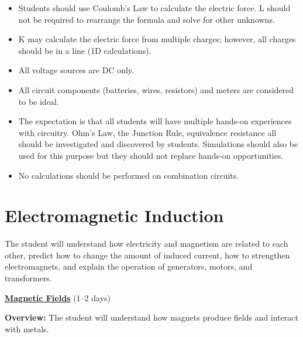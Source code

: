 \documentclass[dvipsnames]{article}
\begin{document}
\begin{itemize}[topsep=-3pt,itemsep=0pt]
    \item Students should use Coulomb's Law to calculate the electric force. L should not be required to rearrange the formula and solve for other unknowns.
    \item K may calculate the electric force from multiple charges; however, all charges should be in a line (1D calculations).
    \item All voltage sources are DC only.
    \item All circuit components (batteries, wires, resistors) and meters are considered to be ideal.
    \item The expectation is that all students will have multiple hands-on experiences with circuitry. Ohm's Law, the Junction Rule, equivalence resistance all should be investigated and discovered by students. Simulations should also be used for this purpose but they should not replace hands-on opportunities.
    \item No calculations should be performed on combination circuits.
\end{itemize}


\section{Electromagnetic Induction}

\vspace{-3pt}
The student will understand how electricity and magnetism are related to each other, predict how to change the amount of induced current, how to strengthen electromagnets, and explain the operation of generators, motors, and transformers.
\vspace{3pt}

\textbf{\underline{Magnetic Fields}} (1--2 days)

\textbf{Overview:} The student will understand how magnets produce fields and interact with metals.
\end{document}
